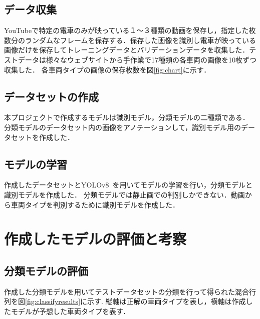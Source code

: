 \begin{multicols*}{2}
\subsection{データ収集}
YouTubeで特定の電車のみが映っている１〜３種類の動画を保存し，指定した枚数分のランダムなフレームを保存する．保存した画像を識別し電車が映っている画像だけを保存してトレーニングデータとバリデーションデータを収集した．テストデータは様々なウェブサイトから手作業で17種類の各車両の画像を10枚ずつ収集した．
各車両タイプの画像の保存枚数を図\ref{fig:chart}に示す．
\subsection{データセットの作成}
本プロジェクトで作成するモデルは識別モデル，分類モデルの二種類である．
分類モデルのデータセット内の画像をアノテーションして，識別モデル用のデータセットを作成した．


\subsection{モデルの学習}
作成したデータセットとYOLOv8~\cite{bk1}を用いてモデルの学習を行い，分類モデルと識別モデルを作成した．
分類モデルでは静止画での判別しかできない．動画から車両タイプを判別するために識別モデルを作成した．




\section{作成したモデルの評価と考察}
\subsection{分類モデルの評価}
作成した分類モデルを用いてテストデータセットの分類を行って得られた混合行列を図\ref{fig:classifyresults}に示す.
縦軸は正解の車両タイプを表し，横軸は作成したモデルが予想した車両タイプを表す．


\end{multicols*}

